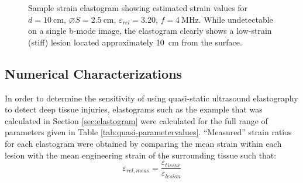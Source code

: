 			\begin{figure}[!htb]
				\centering
				\caption[Sample strain elastogram for a hard spherical lesion]{Sample strain elastogram showing estimated strain values for $d=\SI{10}{\cm}$, $\diameter S = \SI{2.5}{\cm}$, $\varepsilon_{rel} = 3.20$, $f = \SI{4}{\MHz}$. While undetectable on a single b-mode image, the elastogram clearly shows a low-strain (stiff) lesion located approximately \SI{10}{\cm} from the surface.}
				\label{fig:sample_elastogram}
			\end{figure}

		\subsection{Numerical Characterizations}
			\label{sec:numericalcharacterizations}
			In order to determine the sensitivity of using quasi-static ultrasound elastography to detect deep tissue injuries, elastograms such as the example that was calculated in Section \ref{sec:elastogram} were calculated for the full range of parameters given in Table \ref{tab:quasi-parametervalues}. ``Measured'' strain ratios for each elastogram were obtained by comparing the mean strain within each lesion with the mean engineering strain of the surrounding tissue such that:
			\begin{equation}
				\varepsilon_{rel,meas} = \frac{\varepsilon_{tissue}}{\varepsilon_{lesion}}
			\end{equation}

